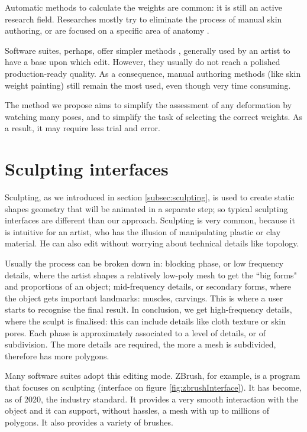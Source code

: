 \documentclass[12pt,twoside]{report}
\begin{document}
Automatic methods to calculate the weights are common: it is still an active research field. Researches mostly try to eliminate the process of manual skin authoring, or are focused on a specific area of anatomy \cite{lewis2000pose}.

Software suites, perhaps, offer simpler methods \cite{got2019developement}, generally used by an artist to have a base upon which edit. However, they usually do not reach a polished production-ready quality. As a consequence, manual authoring methods (like skin weight painting) still remain the most used, even though very time consuming.

The method we propose aims to simplify the assessment of any deformation by watching many poses, and to simplify the task of selecting the correct weights. As a result, it may require less trial and error.

\section{Sculpting interfaces}
\label{sec:sculptUI}
Sculpting, as we introduced in section \ref{subsec:sculpting}, is used to create static shapes geometry that will be animated in a separate step; so typical sculpting interfaces are different than our approach. Sculpting is very common, because it is intuitive for an artist, who has the illusion of manipulating plastic or clay material. He can also edit without worrying about technical details \cite{10.1145/2897824.2925956} like topology.

Usually the process \cite{spencer2010zbrush} can be broken down in: blocking phase, or low frequency details, where the artist shapes a relatively low-poly mesh to get the ``big forms" and proportions of an object; mid-frequency details, or secondary forms, where the object gets important landmarks: muscles, carvings. This is where a user starts to recognise the final result. In conclusion, we get high-frequency details, where the sculpt is finalised: this can include details like cloth texture or skin pores. Each phase is approximately associated to a level of details, or of subdivision. The more details are required, the more a mesh is subdivided, therefore has more polygons.

Many software suites adopt this editing mode. ZBrush, for example, is a program that focuses on sculpting (interface on figure \ref{fig:zbrushInterface}). It has become, as of 2020, the industry standard. It provides a very smooth interaction with the object and it can support, without hassles, a mesh with up to millions of polygons. It also provides a variety of brushes.
\end{document}
